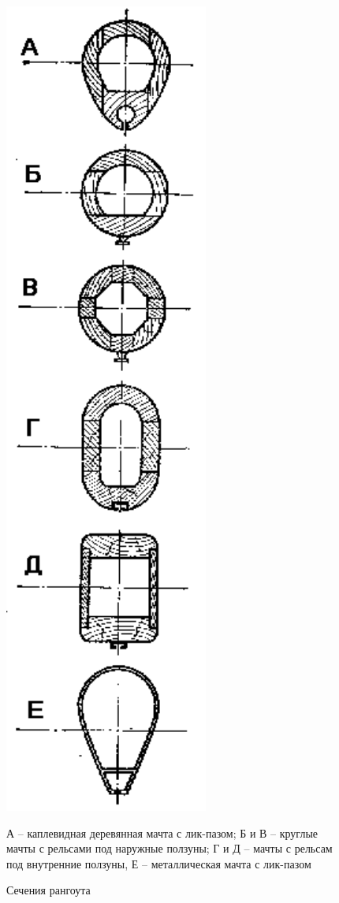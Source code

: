 \documentclass[a4paper, 12pt, twoside, final]{scrbook}
\begin{document}
\begin{figure}[htbp]
\centering\includegraphics{Sechenija_rangouta}
\caption{Сечения рангоута}
\label{fig:37}
\centering\small
А \--- каплевидная деревянная мачта с лик-пазом; Б и В \--- круглые мачты
с рельсами под наружные ползуны; Г и Д \--- мачты с рельсам под внутренние
ползуны, Е \--- металлическая мачта с лик-пазом 
\end{figure}
\end{document}
